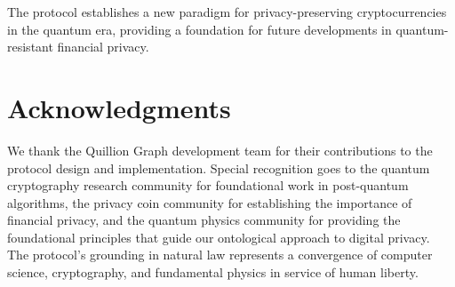 \documentclass[12pt,a4paper]{article}
\begin{document}
The protocol establishes a new paradigm for privacy-preserving cryptocurrencies in the quantum era, providing a foundation for future developments in quantum-resistant financial privacy.

\section*{Acknowledgments}

We thank the Quillion Graph development team for their contributions to the protocol design and implementation. Special recognition goes to the quantum cryptography research community for foundational work in post-quantum algorithms, the privacy coin community for establishing the importance of financial privacy, and the quantum physics community for providing the foundational principles that guide our ontological approach to digital privacy. The protocol's grounding in natural law represents a convergence of computer science, cryptography, and fundamental physics in service of human liberty.
\end{document}
